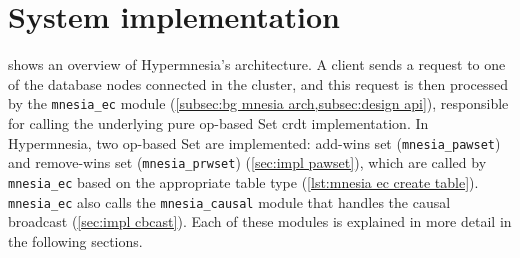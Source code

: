 
\section{System implementation} \label{sec:impl}


 shows an overview of Hypermnesia's architecture. 
A client sends a request to one of the database nodes connected in the cluster, 
and this request is then processed by the \verb|mnesia_ec| 
module (\cref{subsec:bg mnesia arch,subsec:design api}), responsible
for calling the underlying pure op-based Set \acrshort{crdt} implementation.
In Hypermnesia, two op-based Set 
are implemented: add-wins set (\verb|mnesia_pawset|) and remove-wins set (\verb|mnesia_prwset|)
(\cref{sec:impl pawset}), which are called by \verb|mnesia_ec| based on the appropriate
table type (\cref{lst:mnesia ec create table}). 
\verb|mnesia_ec| also calls the \verb|mnesia_causal| module that handles the causal 
broadcast (\cref{sec:impl cbcast}). Each of these modules is explained in more
detail in the following sections.


